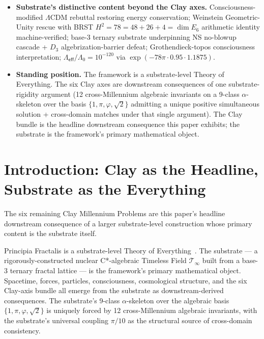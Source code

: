 \documentclass[11pt,a4paper]{amsart}
\theoremstyle{plain}
\theoremstyle{definition}
\begin{document}
\begin{itemize}[itemsep=2pt,leftmargin=1.4em]
\item \textbf{Substrate's distinctive content beyond the Clay axes.} Consciousness-modified $\Lambda$CDM rebuttal restoring energy conservation; Weinstein Geometric-Unity rescue with BRST $H^2 = 78 = 48 + 26 + 4 = \dim E_6$ arithmetic identity machine-verified; base-3 ternary substrate underpinning NS no-blowup cascade + $D_3$ algebrization-barrier defeat; Grothendieck-topos consciousness interpretation; $\Lambda_{\textsf{eff}}/\Lambda_0 = 10^{-120}$ via $\exp(-78\pi \cdot 0.95 \cdot 1.1875)$.
\item \textbf{Standing position.} The framework is a substrate-level Theory of Everything. The six Clay axes are downstream consequences of one substrate-rigidity argument (12 cross-Millennium algebraic invariants on a 9-class $\alpha$-skeleton over the basis $\{1, \pi, \varphi, \sqrt{2}\}$ admitting a unique positive simultaneous solution + cross-domain matches under that single argument). The Clay bundle is the headline downstream consequence this paper exhibits; the substrate is the framework's primary mathematical object.
\end{itemize}

\tableofcontents

\section{Introduction: Clay as the Headline, Substrate as the Everything}\label{sec:intro}

The six remaining Clay Millennium Problems are this paper's headline downstream consequence of a larger substrate-level construction whose primary content is the substrate itself.

Principia Fractalis is a substrate-level Theory of Everything~\cite{cohen2026book,cohen2025unifiedClay,cohen2026corroborating}. The substrate --- a rigorously-constructed nuclear C*-algebraic Timeless Field $\mathcal{T}_\infty$ built from a base-3 ternary fractal lattice --- is the framework's primary mathematical object. Spacetime, forces, particles, consciousness, cosmological structure, and the six Clay-axis bundle all emerge from the substrate as downstream-derived consequences. The substrate's 9-class $\alpha$-skeleton over the algebraic basis $\{1, \pi, \varphi, \sqrt{2}\}$ is uniquely forced by 12 cross-Millennium algebraic invariants, with the substrate's universal coupling $\pi/10$ as the structural source of cross-domain consistency.
\end{document}
